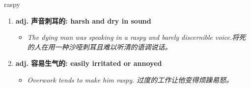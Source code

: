 
\begin{frame}
{\huge raspy}
\begin{center}
\begin{enumerate}\Large
  \item \textbf{adj. 声音刺耳的: harsh and dry in sound}
  \begin{itemize}
    \item \em{\Large{The dying man was speaking in a raspy and barely discernible voice.将死的人在用一种沙哑刺耳且难以听清的语调说话。}}
  \end{itemize}
  \item \textbf{adj. 容易生气的: easily irritated or annoyed}
  \begin{itemize}
    \item \em{\Large{Overwork tends to make him raspy. 过度的工作让他变得烦躁易怒。}}
  \end{itemize}
\end{enumerate}
\end{center}
\end{frame}
